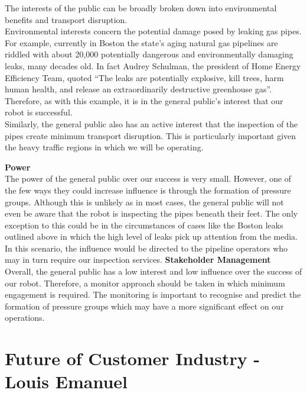 \documentclass[11pt]{article}		%
\begin{document}
        The interests of the public can be broadly broken down into environmental benefits and transport disruption.\\
	    \hspace*{3ex}Environmental interests concern the potential damage posed by leaking gas pipes. For example, currently in Boston the state’s aging natural gas pipelines are riddled with about 20,000 potentially dangerous and environmentally damaging leaks, many decades old. In fact Audrey Schulman, the president of Home Energy Efficiency Team, quoted  “The leaks are potentially explosive, kill trees, harm human health, and release an extraordinarily destructive greenhouse gas”. Therefore, as with this example, it is in the general public's interest that our robot is successful. \\
        \hspace*{3ex}Similarly, the general public also has an active interest that the inspection of the pipes create minimum transport disruption. This is particularly important given the heavy traffic regions in which we will be operating. 
        
        \textbf{Power}\\
        The power of the general public over our success is very small. However, one of the few ways they could increase influence is through the formation of pressure groups. Although this is unlikely as in most cases, the general public will not even be aware that the robot is inspecting the pipes beneath their feet. The only exception to this could be in the circumstances of cases like the Boston leaks outlined above in which the high level of leaks pick up attention from the media. In this scenario, the influence would be directed to the pipeline operators who may in turn require our inspection services.
        \textbf{Stakeholder Management}\\
        
        Overall, the general public has a low interest and low influence over the success of our robot. Therefore, a monitor approach should be taken in which minimum engagement is required. The monitoring is important to recognise and predict the formation of pressure groups which may have a more significant effect on our operations. 

        
		\section[Future of Customer Industry]{Future of Customer Industry - Louis Emanuel} %
		
\end{document}
